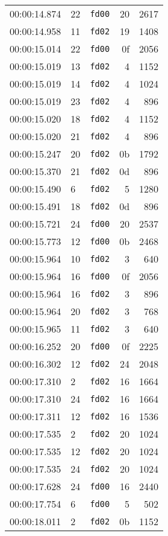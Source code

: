 \documentclass{article}
\begin{document}
\begin{longtable}{lllrr}
00:00:14.874 & 22 & \texttt{fd00} & 20 & 2617 \\
00:00:14.958 & 11 & \texttt{fd02} & 19 & 1408 \\
00:00:15.014 & 22 & \texttt{fd00} & 0f & 2056 \\
00:00:15.019 & 13 & \texttt{fd02} & 4 & 1152 \\
00:00:15.019 & 14 & \texttt{fd02} & 4 & 1024 \\
00:00:15.019 & 23 & \texttt{fd02} & 4 & 896 \\
00:00:15.020 & 18 & \texttt{fd02} & 4 & 1152 \\
00:00:15.020 & 21 & \texttt{fd02} & 4 & 896 \\
00:00:15.247 & 20 & \texttt{fd02} & 0b & 1792 \\
00:00:15.370 & 21 & \texttt{fd02} & 0d & 896 \\
00:00:15.490 & 6 & \texttt{fd02} & 5 & 1280 \\
00:00:15.491 & 18 & \texttt{fd02} & 0d & 896 \\
00:00:15.721 & 24 & \texttt{fd00} & 20 & 2537 \\
00:00:15.773 & 12 & \texttt{fd00} & 0b & 2468 \\
00:00:15.964 & 10 & \texttt{fd02} & 3 & 640 \\
00:00:15.964 & 16 & \texttt{fd00} & 0f & 2056 \\
00:00:15.964 & 16 & \texttt{fd02} & 3 & 896 \\
00:00:15.964 & 20 & \texttt{fd02} & 3 & 768 \\
00:00:15.965 & 11 & \texttt{fd02} & 3 & 640 \\
00:00:16.252 & 20 & \texttt{fd00} & 0f & 2225 \\
00:00:16.302 & 12 & \texttt{fd02} & 24 & 2048 \\
00:00:17.310 & 2 & \texttt{fd02} & 16 & 1664 \\
00:00:17.310 & 24 & \texttt{fd02} & 16 & 1664 \\
00:00:17.311 & 12 & \texttt{fd02} & 16 & 1536 \\
00:00:17.535 & 2 & \texttt{fd02} & 20 & 1024 \\
00:00:17.535 & 12 & \texttt{fd02} & 20 & 1024 \\
00:00:17.535 & 24 & \texttt{fd02} & 20 & 1024 \\
00:00:17.628 & 24 & \texttt{fd00} & 16 & 2440 \\
00:00:17.754 & 6 & \texttt{fd00} & 5 & 502 \\
00:00:18.011 & 2 & \texttt{fd02} & 0b & 1152 \\

\end{longtable}
\end{document}
